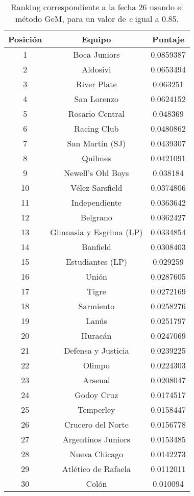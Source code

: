 \begin{table}
	\center
	\begin{tabular}{| c | c | c |}
	  	\hline
	  	Posición & Equipo & Puntaje \\ \hline \hline
		1 & Boca Juniors & 0.0859387 \\ \hline
		2 & Aldosivi & 0.0653494 \\ \hline
		3 & River Plate & 0.063251 \\ \hline
		4 & San Lorenzo & 0.0624152 \\ \hline
		5 & Rosario Central & 0.048369 \\ \hline
		6 & Racing Club & 0.0480862 \\ \hline
		7 & San Martín (SJ) & 0.0439307 \\ \hline
		8 & Quilmes & 0.0421091 \\ \hline
		9 & Newell's Old Boys & 0.038184 \\ \hline
		10 & Vélez Sarsfield & 0.0374806 \\ \hline
		11 & Independiente & 0.0363642 \\ \hline
		12 & Belgrano & 0.0362427 \\ \hline
		13 & Gimnasia y Esgrima (LP) & 0.0334854 \\ \hline
		14 & Banfield & 0.0308403 \\ \hline
		15 & Estudiantes (LP) & 0.029259 \\ \hline
		16 & Unión & 0.0287605 \\ \hline
		17 & Tigre & 0.0272169 \\ \hline
		18 & Sarmiento & 0.0258276 \\ \hline
		19 & Lanús & 0.0251797 \\ \hline
		20 & Huracán & 0.0247069 \\ \hline
		21 & Defensa y Justicia & 0.0239225 \\ \hline
		22 & Olimpo & 0.0224303 \\ \hline
		23 & Arsenal & 0.0208047 \\ \hline
		24 & Godoy Cruz & 0.0174517 \\ \hline
		25 & Temperley & 0.0158447 \\ \hline
		26 & Crucero del Norte & 0.0156778 \\ \hline
		27 & Argentinos Juniors & 0.0153485 \\ \hline
		28 & Nueva Chicago & 0.0142273 \\ \hline
		29 & Atlético de Rafaela & 0.0112011 \\ \hline
		30 & Colón & 0.010094 \\ \hline
	\end{tabular}
	\caption{\footnotesize Ranking correspondiente a la fecha 26 usando el método GeM, para un valor de \emph{c} igual a 0.85.}
\end{table}

